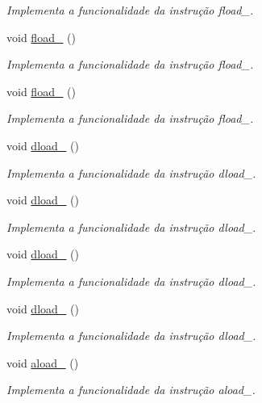 \begin{DoxyCompactItemize}
\begin{DoxyCompactList}\small\item\em Implementa a funcionalidade da instrução fload\+\_. \end{DoxyCompactList}\item 
void \hyperlink{classOperations_a1d1767084d543ab73c8417efe11e195e}{fload\+\_} ()
\begin{DoxyCompactList}\small\item\em Implementa a funcionalidade da instrução fload\+\_. \end{DoxyCompactList}\item 
void \hyperlink{classOperations_a1d7d4685fea35e0619ff468ed57a4f94}{fload\+\_} ()
\begin{DoxyCompactList}\small\item\em Implementa a funcionalidade da instrução fload\+\_. \end{DoxyCompactList}\item 
void \hyperlink{classOperations_a176a81199439e0b22d206c72ea4a1fba}{dload\+\_} ()
\begin{DoxyCompactList}\small\item\em Implementa a funcionalidade da instrução dload\+\_. \end{DoxyCompactList}\item 
void \hyperlink{classOperations_a64632251d88964ff4da0d981103e099c}{dload\+\_} ()
\begin{DoxyCompactList}\small\item\em Implementa a funcionalidade da instrução dload\+\_. \end{DoxyCompactList}\item 
void \hyperlink{classOperations_a55b89c1780e7f91ad7b6da5747d8c6ba}{dload\+\_} ()
\begin{DoxyCompactList}\small\item\em Implementa a funcionalidade da instrução dload\+\_. \end{DoxyCompactList}\item 
void \hyperlink{classOperations_ab3a0a107f5c4a791c71b727142a69523}{dload\+\_} ()
\begin{DoxyCompactList}\small\item\em Implementa a funcionalidade da instrução dload\+\_. \end{DoxyCompactList}\item 
void \hyperlink{classOperations_a9d821a16ef0681755717e8c4f740f6d0}{aload\+\_} ()
\begin{DoxyCompactList}\small\item\em Implementa a funcionalidade da instrução aload\+\_. \end{DoxyCompactList}\item 

\end{DoxyCompactItemize}
